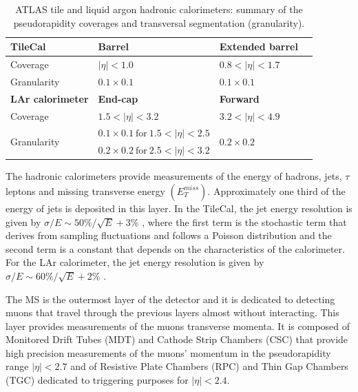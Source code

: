 \begin{table}
	\centering
	\caption{ATLAS tile and liquid argon hadronic calorimeters: summary of the pseudorapidity coverages and transversal segmentation (granularity).}
	\begin{tabular}{llll}
		\toprule 
		\textbf{TileCal} & \textbf{Barrel} & \textbf{Extended barrel} &\\
		\midrule
		\rowcolor{black!7}Coverage & $|\eta|<1.0$ & $0.8<|\eta|<1.7$  & \\
		Granularity & $0.1\times 0.1$ & $0.1\times 0.1$ & \\
		\midrule \midrule
		\textbf{LAr calorimeter} & \textbf{End-cap} & \textbf{Forward} &\\
		\midrule
		\rowcolor{black!7}Coverage & $1.5<|\eta|<3.2$ & $3.2<|\eta|<4.9$  &  \\
		\multirow{2}{*}{Granularity} & $0.1\times 0.1 ~\text{for}~ 1.5<|\eta|<2.5$ & \multirow{2}{*}{$0.2\times 0.2$} & \\
		& $0.2\times 0.2 ~\text{for}~ 2.5<|\eta|<3.2$ & & \\
		\bottomrule
	\end{tabular}
	\label{table:ATLAS_HCAL}
\end{table}

The hadronic calorimeters provide measurements of the energy of hadrons, jets, $\tau$ leptons and missing transverse energy $\left(E_T^{miss}\right)$. Approximately one third of the energy of jets is deposited in this layer. In the TileCal, the jet energy resolution is given by $\sigma/E\sim 50\%/\sqrt{E}+3\%$ \cite{TileCalTech},
where the first term is the stochastic term that derives from sampling fluctuations and follows a Poisson distribution and the second term is a constant that depends on the characteristics of the calorimeter. For the LAr calorimeter, the jet energy resolution is given by $\sigma/E\sim 60\%/\sqrt{E}+2\%$ \cite{ATLAS_LAr_TDR}.

The MS is the outermost layer of the detector and it is dedicated to detecting muons that travel through the previous layers almost without interacting. This layer provides measurements of the muons transverse momenta. It is composed of Monitored Drift Tubes (MDT) and Cathode Strip Chambers (CSC) that provide high precision measurements of the muons' momentum in the pseudorapidity range $|\eta|<2.7$ and of Resistive Plate Chambers (RPC) and Thin Gap Chambers (TGC) dedicated to triggering purposes for $|\eta|<2.4$.

